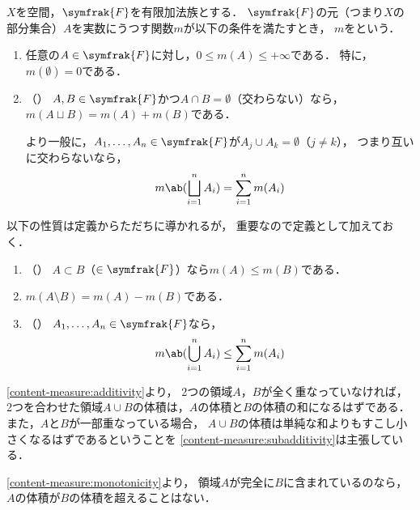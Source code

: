 \documentclass[../sotsu.tex]{subfiles}
\begin{document}
\begin{definition}
    \label{dfn:content-measure}
    $X$を空間，$\symfrak{F}$を有限加法族とする．
    $\symfrak{F}$の元（つまり$X$の部分集合）$A$を実数にうつす関数$m$が以下の条件を満たすとき，
    $m$をという．
    \begin{enumerate}
        \item \label{content-measure:positivity}
            任意の$A \in \symfrak{F}$に対し，$0 \leq m(A) \leq +\infty$である．
            特に，$m(\emptyset) = 0$である．
        \item \label{content-measure:additivity}（）
            $A, B \in \symfrak{F}$かつ$A \cap B = \emptyset$（交わらない）なら，
            $m(A \sqcup B) = m(A) + m(B)$である．

            より一般に，$A_1, \dots, A_n \in \symfrak{F}$が$A_j \cup A_k = \emptyset$（$j \neq k$），
            つまり互いに交わらないなら，
            \begin{equation*}
                m \ab( \bigsqcup_{i=1}^{n} A_i ) = \sum_{i=1}^{n} m(A_i)
            \end{equation*}
    \end{enumerate}
    以下の性質は定義からただちに導かれるが，
    重要なので定義として加えておく．
    \begin{enumerate}[resume]
        \item \label{content-measure:monotonicity}（）
            $A \subset B$（$\in \symfrak{F}$）なら$m(A) \leq m(B)$である．
        \item $m(A \setminus B) = m(A) - m(B)$である．
        \item \label{content-measure:subadditivity}（）
            $A_1, \dots, A_n \in \symfrak{F}$なら，
            \begin{equation*}
                m \ab( \bigcup_{i=1}^{n} A_i ) \leq \sum_{i=1}^{n} m(A_i)
            \end{equation*}
    \end{enumerate}
\end{definition}

\cref{content-measure:additivity}より，
2つの領域$A$，$B$が全く重なっていなければ，
2つを合わせた領域$A \cup B$の体積は，$A$の体積と$B$の体積の和になるはずである．
また，$A$と$B$が一部重なっている場合，
$A \cup B$の体積は単純な和よりもすこし小さくなるはずであるということを
\cref{content-measure:subadditivity}は主張している．

\cref{content-measure:monotonicity}より，
領域$A$が完全に$B$に含まれているのなら，$A$の体積が$B$の体積を超えることはない．
\end{document}
